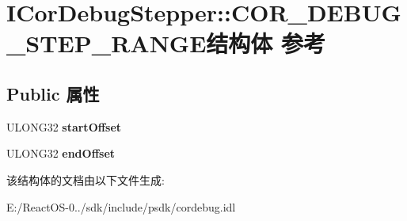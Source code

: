 \hypertarget{struct_i_cor_debug_stepper_1_1_c_o_r___d_e_b_u_g___s_t_e_p___r_a_n_g_e}{}\section{I\+Cor\+Debug\+Stepper\+:\+:C\+O\+R\+\_\+\+D\+E\+B\+U\+G\+\_\+\+S\+T\+E\+P\+\_\+\+R\+A\+N\+G\+E结构体 参考}
\label{struct_i_cor_debug_stepper_1_1_c_o_r___d_e_b_u_g___s_t_e_p___r_a_n_g_e}
\subsection*{Public 属性}
\begin{DoxyCompactItemize}
\item 
\mbox{\label{struct_i_cor_debug_stepper_1_1_c_o_r___d_e_b_u_g___s_t_e_p___r_a_n_g_e_a0fb3ebe687c71268e532ec1dbc8452ae}} 
U\+L\+O\+N\+G32 {\bfseries start\+Offset}
\item 
\mbox{\label{struct_i_cor_debug_stepper_1_1_c_o_r___d_e_b_u_g___s_t_e_p___r_a_n_g_e_a9038da3b87eba8e1a2473289a93d5f7f}} 
U\+L\+O\+N\+G32 {\bfseries end\+Offset}
\end{DoxyCompactItemize}


该结构体的文档由以下文件生成\+:\begin{DoxyCompactItemize}
\item 
E\+:/\+React\+O\+S-\/0../sdk/include/psdk/cordebug.\+idl\end{DoxyCompactItemize}
